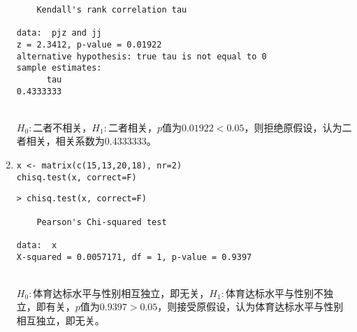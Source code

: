 \begin{enumerate}
\begin{lstlisting}
	Kendall's rank correlation tau

data:  pjz and jj
z = 2.3412, p-value = 0.01922
alternative hypothesis: true tau is not equal to 0
sample estimates:
      tau 
0.4333333 
\end{lstlisting}
        \summary\\
        $H_0:$二者不相关，$H_1:$二者相关，$p$值为$0.01922<0.05$，则拒绝原假设，认为二者相关，相关系数为0.4333333。
        \item
        \code
\begin{lstlisting}
x <- matrix(c(15,13,20,18), nr=2)
chisq.test(x, correct=F)
\end{lstlisting}
        \out
\begin{lstlisting}
> chisq.test(x, correct=F)

	Pearson's Chi-squared test

data:  x
X-squared = 0.0057171, df = 1, p-value = 0.9397
\end{lstlisting}
        \summary\\
        $H_0:$体育达标水平与性别相互独立，即无关，$H_1:$体育达标水平与性别不独立，即有关，$p$值为$0.9397>0.05$，则接受原假设，认为体育达标水平与性别相互独立，即无关。
    \end{enumerate}
\clearpage